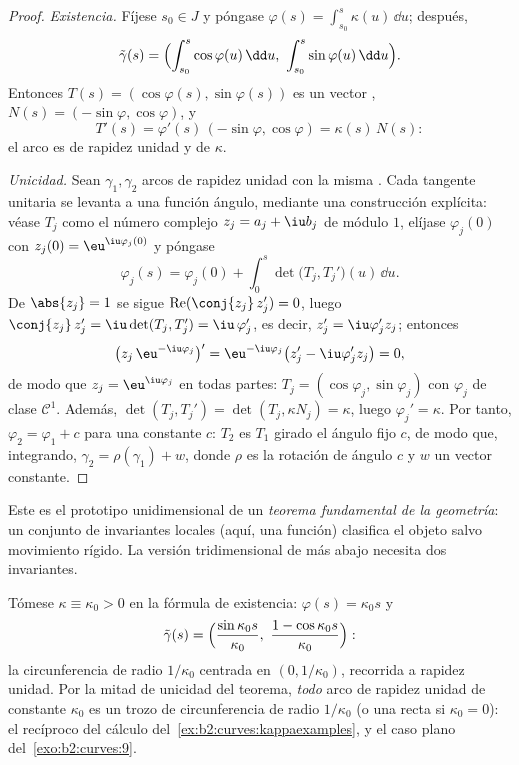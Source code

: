 \begin{proof}
\emph{Existencia.} Fíjese $s_0 \in J$ y póngase $\varphi(s) =
\int_{s_0}^s \kappa(u)\,\dd u$; después,
\[
\tilde\gamma(s) = \Bigl(\int_{s_0}^s \cos\varphi(u)\,\dd u,\
\int_{s_0}^s \sin\varphi(u)\,\dd u\Bigr).
\]
Entonces $T(s) = (\cos\varphi(s), \sin\varphi(s))$ es un vector
, $N(s) = (-\sin\varphi, \cos\varphi)$, y
\[
T'(s) = \varphi'(s)\,(-\sin\varphi, \cos\varphi)
= \kappa(s)\,N(s) :
\]
el arco es de rapidez unidad y de  $\kappa$.

\emph{Unicidad.} Sean $\gamma_1, \gamma_2$ arcos de rapidez unidad
con la misma \omterm{thm:b2:curves:frenet2d}{curvatura}. Cada tangente unitaria se levanta a una
función ángulo, mediante una construcción explícita: véase $T_j$
como el número complejo $z_j = a_j + \iu b_j$ de módulo $1$, elíjase
$\varphi_j(0)$ con $z_j(0) = \eu^{\iu\varphi_j(0)}$ y póngase
\[
\varphi_j(s) = \varphi_j(0) + \int_0^s\det\bigl(T_j,
T_j'\bigr)(u)\,\dd u .
\]
De $\abs{z_j} = 1$ se sigue $\operatorname{Re}(\conj{z_j}\,z_j') =
0$, luego $\conj{z_j}\,z_j' = \iu\det(T_j, T_j') = \iu\,\varphi_j'$,
es decir, $z_j' = \iu\varphi_j'z_j$; entonces
\[
\bigl(z_j\,\eu^{-\iu\varphi_j}\bigr)'
= \eu^{-\iu\varphi_j}\bigl(z_j' - \iu\varphi_j'z_j\bigr) = 0,
\]
de modo que $z_j = \eu^{\iu\varphi_j}$ en todas partes: $T_j =
(\cos\varphi_j, \sin\varphi_j)$ con $\varphi_j$ de clase $\mathcal
C^1$. Además, $\det(T_j, T_j') = \det(T_j, \kappa N_j) = \kappa$,
luego $\varphi_j' = \kappa$. Por tanto, $\varphi_2 = \varphi_1 + c$
para una constante $c$: $T_2$ es $T_1$ girado el ángulo fijo $c$, de
modo que, integrando, $\gamma_2 = \rho(\gamma_1) + w$, donde $\rho$
es la rotación de ángulo $c$ y $w$ un vector constante.
\end{proof}

\begin{remark}
Este es el prototipo unidimensional de un \emph{teorema fundamental
de la geometría}: un conjunto  de invariantes locales (aquí,
una función) clasifica el objeto salvo movimiento rígido. La versión
tridimensional de más abajo necesita dos invariantes.
\end{remark}

\begin{example}\label{ex:b2:curves:constantkappa}
Tómese $\kappa \equiv \kappa_0 > 0$ en la fórmula de existencia:
$\varphi(s) = \kappa_0 s$ y
\[
\tilde\gamma(s) = \Bigl(\frac{\sin\kappa_0s}{\kappa_0},\
\frac{1 - \cos\kappa_0s}{\kappa_0}\Bigr) :
\]
la circunferencia de radio $1/\kappa_0$ centrada en $(0,
1/\kappa_0)$, recorrida a rapidez unidad. Por la mitad de unicidad
del teorema, \emph{todo} arco de rapidez unidad de 
constante $\kappa_0$ es un trozo de circunferencia de radio
$1/\kappa_0$ (o una recta si $\kappa_0 = 0$): el recíproco del
cálculo del~\cref{ex:b2:curves:kappaexamples}, y el caso plano del~\cref{exo:b2:curves:9}.
\end{example}

